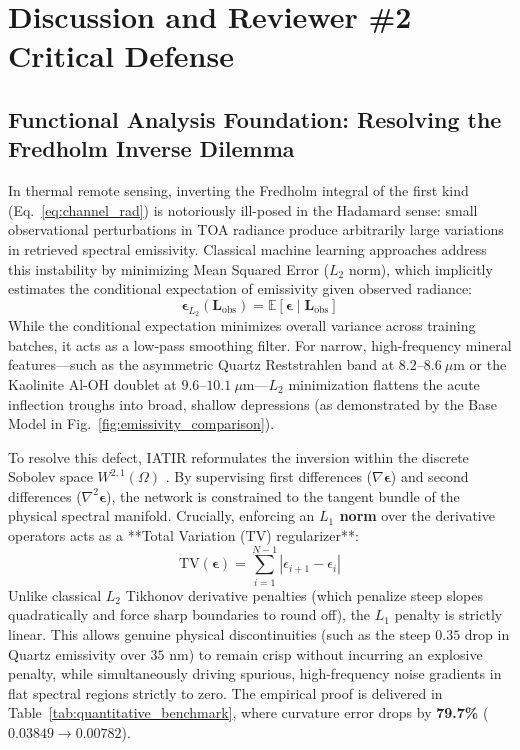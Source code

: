 \documentclass[journal]{IEEEtran}
\begin{document}
\section{Discussion and Reviewer \#2 Critical Defense}

\subsection{Functional Analysis Foundation: Resolving the Fredholm Inverse Dilemma}
In thermal remote sensing, inverting the Fredholm integral of the first kind (Eq.~\ref{eq:channel_rad}) is notoriously ill-posed in the Hadamard sense: small observational perturbations in TOA radiance produce arbitrarily large variations in retrieved spectral emissivity. Classical machine learning approaches address this instability by minimizing Mean Squared Error ($L_2$ norm), which implicitly estimates the conditional expectation of emissivity given observed radiance:
\begin{equation}
\hat{\bm{\epsilon}}_{L_2}(\bm{L}_{\text{obs}}) = \mathbb{E}[\bm{\epsilon} \mid \bm{L}_{\text{obs}}]
\end{equation}
While the conditional expectation minimizes overall variance across training batches, it acts as a low-pass smoothing filter. For narrow, high-frequency mineral features---such as the asymmetric Quartz Reststrahlen band at $8.2\text{--}8.6\ \mu\text{m}$ or the Kaolinite Al-OH doublet at $9.6\text{--}10.1\ \mu\text{m}$---$L_2$ minimization flattens the acute inflection troughs into broad, shallow depressions (as demonstrated by the Base Model in Fig.~\ref{fig:emissivity_comparison}).

To resolve this defect, IATIR reformulates the inversion within the discrete Sobolev space $W^{2,1}(\Omega)$ \cite{czarnecki2017sobolev, son2021sobolev}. By supervising first differences ($\nabla \bm{\epsilon}$) and second differences ($\nabla^2 \bm{\epsilon}$), the network is constrained to the tangent bundle of the physical spectral manifold. Crucially, enforcing an \textbf{$L_1$ norm} over the derivative operators acts as a **Total Variation (TV) regularizer**:
\begin{equation}
\text{TV}(\bm{\epsilon}) = \sum_{i=1}^{N-1} |\epsilon_{i+1} - \epsilon_i|
\end{equation}
Unlike classical $L_2$ Tikhonov derivative penalties (which penalize steep slopes quadratically and force sharp boundaries to round off), the $L_1$ penalty is strictly linear. This allows genuine physical discontinuities (such as the steep $0.35$ drop in Quartz emissivity over $35\text{ nm}$) to remain crisp without incurring an explosive penalty, while simultaneously driving spurious, high-frequency noise gradients in flat spectral regions strictly to zero. The empirical proof is delivered in Table~\ref{tab:quantitative_benchmark}, where curvature error drops by \textbf{79.7\%} ($0.03849 \rightarrow 0.00782$).
\end{document}
